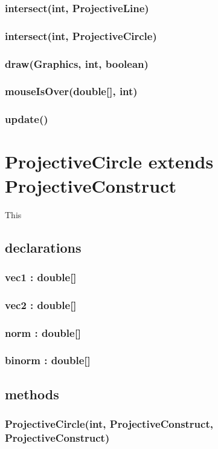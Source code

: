 \documentclass[a4paper,10pt]{report}
\begin{document}
\subsubsection{intersect(int, ProjectiveLine)}
\subsubsection{intersect(int, ProjectiveCircle)}
\subsubsection{draw(Graphics, int, boolean)}
\subsubsection{mouseIsOver(double[], int)}
\subsubsection{update()}
\section{ProjectiveCircle extends ProjectiveConstruct} This
\subsection{declarations}
\subsubsection{vec1 : double[]}
\subsubsection{vec2 : double[]}
\subsubsection{norm : double[]}
\subsubsection{binorm : double[]}
\subsection{methods}
\subsubsection{ProjectiveCircle(int, ProjectiveConstruct, ProjectiveConstruct)}
\end{document}
